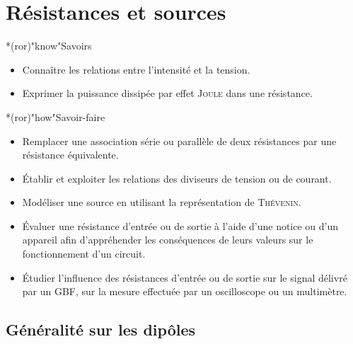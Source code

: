 \documentclass[../../main/main.tex]{subfiles}
\begin{document}
\setcounter{chapter}{1}

\chapter{R\'esistances et sources}

\vfill

\begin{prgm}
	\begin{tcb}*(ror)"know"{Savoirs}
		\begin{itemize}[label=$\diamond$, leftmargin=10pt]
			\item Connaître les relations entre l'intensité et la tension.
			\item Exprimer la puissance dissipée par effet \textsc{Joule} dans une
			      résistance.
		\end{itemize}
	\end{tcb}

	\begin{tcb}*(ror)"how"{Savoir-faire}
		\begin{itemize}[label=$\diamond$, leftmargin=10pt]
			\item Remplacer une association série ou parallèle de deux
			      résistances par une résistance équivalente.
			\item Établir et exploiter les relations des diviseurs de
			      tension ou de courant.
			\item Modéliser une source en utilisant la représentation de
			      \textsc{Thévenin}.
			\item Évaluer une résistance d'entrée ou de sortie à
			      l'aide d'une notice ou d'un appareil afin d'appréhender les
			      conséquences de leurs valeurs sur le fonctionnement d'un circuit.
			\item Étudier l'influence des résistances d'entrée ou de
			      sortie sur le signal délivré par un GBF, sur la mesure effectuée par
			      un oscilloscope ou un multimètre.
		\end{itemize}
	\end{tcb}
\end{prgm}

\vfill
\minitoc
\vfill

\newpage

\section{Généralité sur les dipôles}
\end{document}
